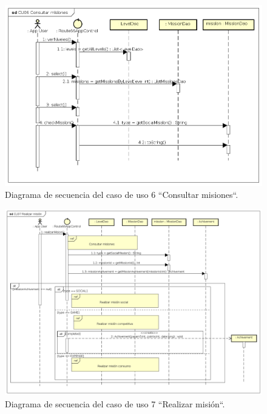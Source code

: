 \documentclass[twoside]{report}
\begin{document}
\begin{figure}[H]
\begin{center}
\includegraphics[width=\textwidth]{images/sequence/CU6}
\caption{Diagrama de secuencia del caso de uso 6 “Consultar misiones“.}
\end{center}
\end{figure}

\begin{figure}[H]
\begin{center}
\includegraphics[width=\textwidth]{images/sequence/CU7}
\caption{Diagrama de secuencia del caso de uso 7 “Realizar misión“.}
\end{center}
\end{figure}
\end{document}
